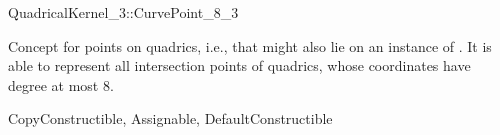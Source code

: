 \begin{ccRefConcept}{QuadricalKernel_3::CurvePoint_8_3}

\ccDefinition

Concept for points on quadrics, i.e., that might also lie
on an instance of . It is able to represent all 
intersection points of quadrics, whose coordinates have degree at
most 8.

\ccRefines
CopyConstructible, Assignable, DefaultConstructible

\ccHasModels
{}

\end{ccRefConcept}

